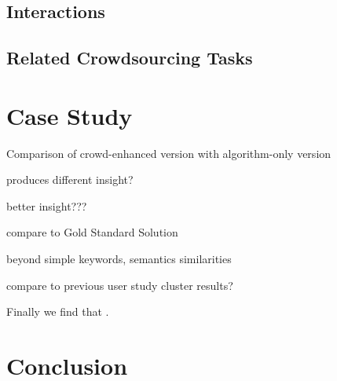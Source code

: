 \documentclass[journal]{vgtc}                %
\begin{document}
\subsection{Interactions}

\subsection{Related Crowdsourcing Tasks}


\section{Case Study}

Comparison of crowd-enhanced version with algorithm-only version


produces different insight?

better insight???


compare to Gold Standard Solution


beyond simple keywords, semantics similarities


compare to previous user study cluster results?

Finally we find that .

\section{Conclusion}


%

%
%
%


\end{document}
